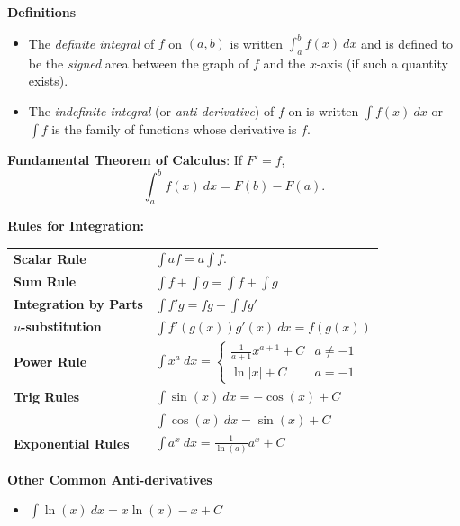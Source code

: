 \documentclass{article}
\newenvironment{bx}[1][]{
\begin{tcolorbox}[colback=white!97!black, title=#1, arc=0in, halign=flush left, left=1mm, right=1mm,]
}{
\end{tcolorbox}
}
\begin{document}
\newpage

\begin{multicols}{2}
\begin{bx}[Integration]
\textbf{Definitions}
\begin{itemize}
    \item The \textit{definite integral} of $f$ on $(a,b)$ is written $\int_a^bf(x)\ dx$ and is defined to be the \textit{signed} area between the graph of $f$ and the $x$-axis (if such a quantity exists).
    \item The \textit{indefinite integral} (or \textit{anti-derivative}) of $f$ on is written $\int f(x)\ dx$ or $\int f$ is the family of functions whose derivative is $f$.
\end{itemize}

\vspace{0.5em}

\textbf{Fundamental Theorem of Calculus}: If $F'=f$,
    $$\int_a^bf(x)\ dx = F(b)-F(a).$$

\textbf{Rules for Integration:}
\begin{center}
\def\arraystretch{1.5}
\begin{tabular}{@{}ll@{}}
\toprule[0.4mm]
\textbf{Scalar Rule} & $\int a f = a \int f$. \\
\textbf{Sum Rule} & $\int f + \int g= \int f + \int g$ \\
\textbf{Integration by Parts} & $\int f'g = fg - \int fg' $ \\
\textbf{$u$-substitution} & $\int f'(g(x))g'(x)\ dx =  f(g(x))$ \\
\midrule[0.4mm]
\textbf{Power Rule}
 & $\int x^a \ dx = \begin{cases}
\frac{1}{a+1}x^{a+1} + C & a \neq -1\\
\ln|x| + C & a = -1
\end{cases}$ \\
\textbf{Trig Rules}  
& $\int \sin(x)\ dx = -\cos(x)+C$\\
& $\int \cos(x)\ dx = \sin(x)+C$ \\

\textbf{Exponential Rules} & $\int a^x\ dx = \frac{1}{\ln(a)}a^x+C$ \\
\bottomrule[0.4mm]
\end{tabular}
\end{center}

\textbf{Other Common Anti-derivatives}
\setlength\leftmargin{2em}
\begin{itemize}
\item $\int\ln(x)\ dx = x\ln(x) - x + C$


\end{itemize}
\end{bx}
\end{multicols}
\end{document}
